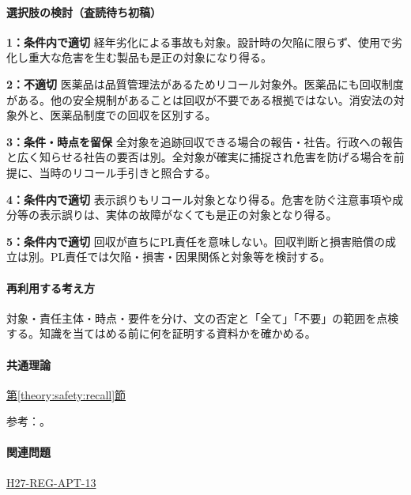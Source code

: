 \paragraph{選択肢の検討（査読待ち初稿）}\mbox{}\par

\noindent\textbf{1：条件内で適切} 経年劣化による事故も対象。設計時の欠陥に限らず、使用で劣化し重大な危害を生む製品も是正の対象になり得る。\par

\noindent\textbf{2：不適切} 医薬品は品質管理法があるためリコール対象外。医薬品にも回収制度がある。他の安全規制があることは回収が不要である根拠ではない。消安法の対象外と、医薬品制度での回収を区別する。\par

\noindent\textbf{3：条件・時点を留保} 全対象を追跡回収できる場合の報告・社告。行政への報告と広く知らせる社告の要否は別。全対象が確実に捕捉され危害を防げる場合を前提に、当時のリコール手引きと照合する。\par

\noindent\textbf{4：条件内で適切} 表示誤りもリコール対象となり得る。危害を防ぐ注意事項や成分等の表示誤りは、実体の故障がなくても是正の対象となり得る。\par

\noindent\textbf{5：条件内で適切} 回収が直ちにPL責任を意味しない。回収判断と損害賠償の成立は別。PL責任では欠陥・損害・因果関係と対象等を検討する。\par

\paragraph{再利用する考え方} 対象・責任主体・時点・要件を分け、文の否定と「全て」「不要」の範囲を点検する。知識を当てはめる前に何を証明する資料かを確かめる。

\paragraph{共通理論} \hyperref[theory:safety:recall]{第\ref*{theory:safety:recall}節}

\par 参考：\cite{saf53_recall2010,saf53_medicine_recall,pl_statute,pl_qa}。

\paragraph{関連問題} \hyperref[q:h27-reg-apt-13]{H27-REG-APT-13}

